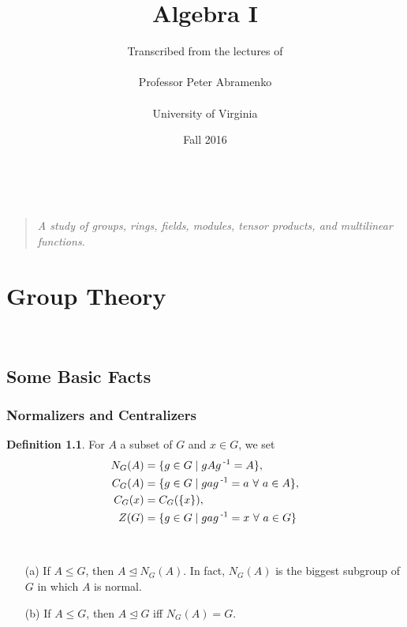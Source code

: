 \documentclass[11pt]{book}
\title{Algebra I}
\author{ Transcribed from the lectures of \\ \ \\ Professor Peter Abramenko \\ \ \\ University of Virginia}
\date{Fall 2016}
\theoremstyle{definition}   \newtheorem{defn}[counter]{Definition} %
\newcommand{\nsg}{\mathrel{\unlhd}}   \newcommand{\ind}{\parindent24pt}   \newcommand{\vn}{\varnothing}
\newcommand{\vs}{\vspace{8pt}}
\numberwithin{counter}{chapter}
\begin{document}
\frontmatter
\maketitle
\tableofcontents
\mainmatter

\ \vspace{100pt}
\begin{quote}
\centering
\textit{A study of groups, rings, fields, modules, tensor products, and multilinear functions.}
\end{quote}

\part{Group Theory}

\ \\

\chapter{Some Basic Facts}

\section*{Normalizers and Centralizers} \vs

\begin{defn}
For $A$ a subset of $G$ and $x \in G$, we set
	\begin{align*}
	N_G(A) &= \{g \in G \mid gAg\operatorname{^{-1}} = A\}, \\
	C_G(A) &= \{g \in G \mid gag\operatorname{^{-1}} = a \ \forall \ a \in A\}, \\
	C_G(x) &= C_G(\{x\}), \\
	Z(G) &= \{g \in G \mid gag\operatorname{^{-1}} = x \ \forall \ a \in G\}
	\end{align*}
\end{defn}

\vs

\begin{remark} \ \\
\begin{enumerate}
\item[(a)] If $A \leq G$, then $A \nsg N_G(A)$. In fact, $N_G(A)$ is the biggest subgroup of $G$ in which $A$ is normal.
\item[(b)] If $A \leq G$, then $A \nsg G$ iff $N_G(A) = G$.
\end{enumerate}
\end{remark}

\vs
\end{document}
